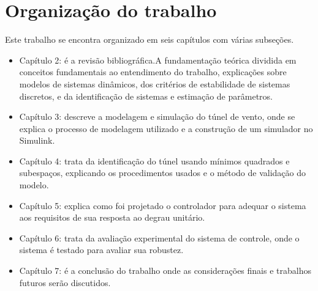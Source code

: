\section{Organização do trabalho}


Este trabalho se encontra organizado em seis capítulos com várias subseções. 
\begin{itemize}
	\item Capítulo 2: é a revisão bibliográfica.A fundamentação teórica dividida em conceitos fundamentais ao entendimento do trabalho, explicações sobre modelos de sistemas dinâmicos, dos critérios de estabilidade de sistemas discretos, e da identificação de sistemas e estimação de parâmetros.
	\item Capítulo 3: descreve a modelagem e simulação do túnel de vento, onde se explica o processo de modelagem utilizado e a construção de um simulador no Simulink.
	\item Capítulo 4: trata da identificação do túnel usando mínimos quadrados e subespaços, explicando os procedimentos usados e o método de validação do modelo.
	\item Capítulo 5: explica como foi projetado o controlador para adequar o sistema aos requisitos de sua resposta ao degrau unitário.
	\item Capítulo 6: trata da avaliação experimental do sistema de controle, onde o sistema é testado para avaliar sua robustez.
	\item Capítulo 7: é a conclusão do trabalho onde as considerações finais e trabalhos futuros serão discutidos.
\end{itemize}     

